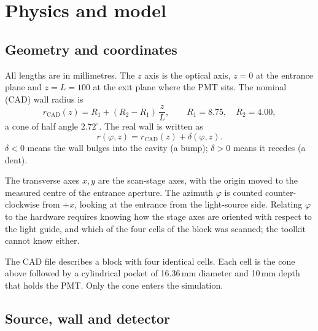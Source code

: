 \documentclass[11pt,a4paper]{article}
\begin{document}
\clearpage

\section{Physics and model}

\subsection{Geometry and coordinates}

All lengths are in millimetres. The $z$ axis is the optical axis, $z=0$ at the entrance plane and
$z=L=100$ at the exit plane where the PMT sits. The nominal (CAD) wall radius is
\[
  r_\mathrm{CAD}(z) = R_1 + (R_2-R_1)\,\frac{z}{L}, \qquad R_1 = 8.75,\quad R_2 = 4.00,
\]
a cone of half angle $2.72^\circ$. The real wall is written as
\[
  r(\varphi,z) = r_\mathrm{CAD}(z) + \delta(\varphi,z).
\]
$\delta<0$ means the wall bulges into the cavity (a bump); $\delta>0$ means it recedes (a dent).

The transverse axes $x,y$ are the scan-stage axes, with the origin moved to the measured centre of the
entrance aperture. The azimuth $\varphi$ is counted counter-clockwise from $+x$, looking at the
entrance from the light-source side. Relating $\varphi$ to the hardware requires knowing how the stage
axes are oriented with respect to the light guide, and which of the four cells of the block was
scanned; the toolkit cannot know either.

The CAD file  describes a block with four
identical cells. Each cell is the cone above followed by a cylindrical pocket of 16.36\,mm diameter
and 10\,mm depth that holds the PMT. Only the cone enters the simulation.

\subsection{Source, wall and detector}
\end{document}
